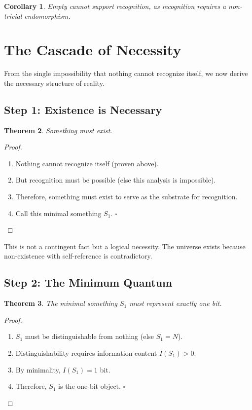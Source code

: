 \documentclass[12pt,a4paper]{article}
\newtheorem{theorem}{Theorem}
\newtheorem{corollary}[theorem]{Corollary}
\begin{document}
\begin{corollary}
Empty cannot support recognition, as recognition requires a non-trivial endomorphism.
\end{corollary}

\section{The Cascade of Necessity}

From the single impossibility that nothing cannot recognize itself, we now derive the necessary structure of reality.

\subsection{Step 1: Existence is Necessary}

\begin{theorem}
Something must exist.
\end{theorem}

\begin{proof}
\begin{enumerate}
\item Nothing cannot recognize itself (proven above).
\item But recognition must be possible (else this analysis is impossible).
\item Therefore, something must exist to serve as the substrate for recognition.
\item Call this minimal something $S_1$. $\square$
\end{enumerate}
\end{proof}

This is not a contingent fact but a logical necessity. The universe exists because non-existence with self-reference is contradictory.

\subsection{Step 2: The Minimum Quantum}

\begin{theorem}
The minimal something $S_1$ must represent exactly one bit.
\end{theorem}

\begin{proof}
\begin{enumerate}
\item $S_1$ must be distinguishable from nothing (else $S_1 = N$).
\item Distinguishability requires information content $I(S_1) > 0$.
\item By minimality, $I(S_1) = 1$ bit.
\item Therefore, $S_1$ is the one-bit object. $\square$
\end{enumerate}
\end{proof}
\end{document}
